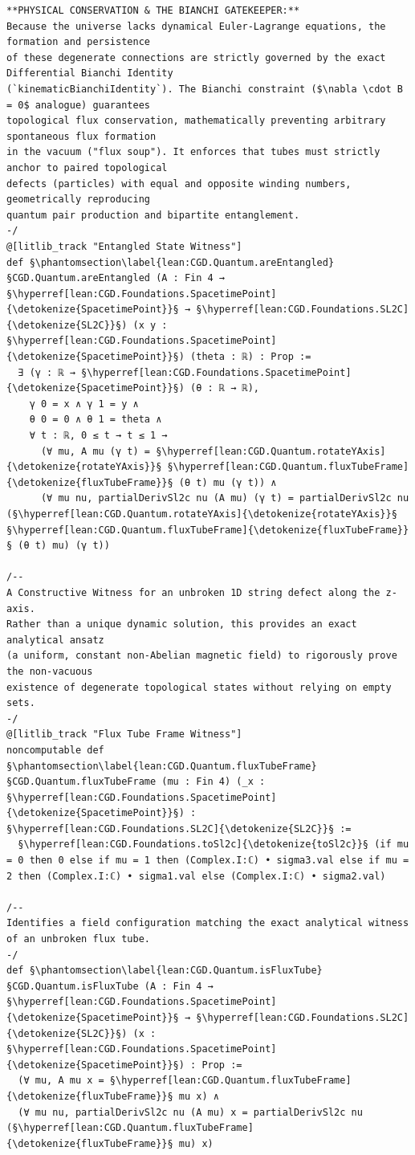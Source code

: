 \begin{verbatim}
**PHYSICAL CONSERVATION & THE BIANCHI GATEKEEPER:**
Because the universe lacks dynamical Euler-Lagrange equations, the formation and persistence 
of these degenerate connections are strictly governed by the exact Differential Bianchi Identity 
(`kinematicBianchiIdentity`). The Bianchi constraint ($\nabla \cdot B = 0$ analogue) guarantees 
topological flux conservation, mathematically preventing arbitrary spontaneous flux formation 
in the vacuum ("flux soup"). It enforces that tubes must strictly anchor to paired topological 
defects (particles) with equal and opposite winding numbers, geometrically reproducing 
quantum pair production and bipartite entanglement.
-/
@[litlib_track "Entangled State Witness"]
def §\phantomsection\label{lean:CGD.Quantum.areEntangled}§CGD.Quantum.areEntangled (A : Fin 4 → §\hyperref[lean:CGD.Foundations.SpacetimePoint]{\detokenize{SpacetimePoint}}§ → §\hyperref[lean:CGD.Foundations.SL2C]{\detokenize{SL2C}}§) (x y : §\hyperref[lean:CGD.Foundations.SpacetimePoint]{\detokenize{SpacetimePoint}}§) (theta : ℝ) : Prop :=
  ∃ (γ : ℝ → §\hyperref[lean:CGD.Foundations.SpacetimePoint]{\detokenize{SpacetimePoint}}§) (θ : ℝ → ℝ),
    γ 0 = x ∧ γ 1 = y ∧
    θ 0 = 0 ∧ θ 1 = theta ∧
    ∀ t : ℝ, 0 ≤ t → t ≤ 1 →
      (∀ mu, A mu (γ t) = §\hyperref[lean:CGD.Quantum.rotateYAxis]{\detokenize{rotateYAxis}}§ §\hyperref[lean:CGD.Quantum.fluxTubeFrame]{\detokenize{fluxTubeFrame}}§ (θ t) mu (γ t)) ∧
      (∀ mu nu, partialDerivSl2c nu (A mu) (γ t) = partialDerivSl2c nu (§\hyperref[lean:CGD.Quantum.rotateYAxis]{\detokenize{rotateYAxis}}§ §\hyperref[lean:CGD.Quantum.fluxTubeFrame]{\detokenize{fluxTubeFrame}}§ (θ t) mu) (γ t))

/--
A Constructive Witness for an unbroken 1D string defect along the z-axis.
Rather than a unique dynamic solution, this provides an exact analytical ansatz
(a uniform, constant non-Abelian magnetic field) to rigorously prove the non-vacuous
existence of degenerate topological states without relying on empty sets.
-/
@[litlib_track "Flux Tube Frame Witness"]
noncomputable def §\phantomsection\label{lean:CGD.Quantum.fluxTubeFrame}§CGD.Quantum.fluxTubeFrame (mu : Fin 4) (_x : §\hyperref[lean:CGD.Foundations.SpacetimePoint]{\detokenize{SpacetimePoint}}§) : §\hyperref[lean:CGD.Foundations.SL2C]{\detokenize{SL2C}}§ :=
  §\hyperref[lean:CGD.Foundations.toSl2c]{\detokenize{toSl2c}}§ (if mu = 0 then 0 else if mu = 1 then (Complex.I:ℂ) • sigma3.val else if mu = 2 then (Complex.I:ℂ) • sigma1.val else (Complex.I:ℂ) • sigma2.val)

/--
Identifies a field configuration matching the exact analytical witness of an unbroken flux tube.
-/
def §\phantomsection\label{lean:CGD.Quantum.isFluxTube}§CGD.Quantum.isFluxTube (A : Fin 4 → §\hyperref[lean:CGD.Foundations.SpacetimePoint]{\detokenize{SpacetimePoint}}§ → §\hyperref[lean:CGD.Foundations.SL2C]{\detokenize{SL2C}}§) (x : §\hyperref[lean:CGD.Foundations.SpacetimePoint]{\detokenize{SpacetimePoint}}§) : Prop :=
  (∀ mu, A mu x = §\hyperref[lean:CGD.Quantum.fluxTubeFrame]{\detokenize{fluxTubeFrame}}§ mu x) ∧
  (∀ mu nu, partialDerivSl2c nu (A mu) x = partialDerivSl2c nu (§\hyperref[lean:CGD.Quantum.fluxTubeFrame]{\detokenize{fluxTubeFrame}}§ mu) x)


\end{verbatim}
